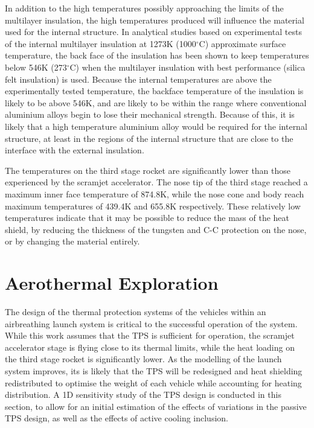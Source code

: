 In addition to the high temperatures possibly approaching the limits of the multilayer insulation, the high temperatures produced will influence the material used for the internal structure. 
In analytical studies based on experimental tests of the internal multilayer insulation at 1273K (1000$^\circ$C) approximate surface temperature, the back face of the insulation has been shown to keep temperatures below 546K (273$^\circ$C)\cite{Kourtides} when the multilayer insulation with best performance (silica felt insulation\cite{Kourtides}) is used. Because the internal temperatures are above the experimentally tested temperature, the backface temperature of the insulation is likely to be above 546K, and are likely to be within the range where conventional aluminium alloys begin to lose their mechanical strength. Because of this, it is likely that a high temperature aluminium alloy would be required for the internal structure, at least in the regions of the internal structure that are close to the interface with the external insulation.

The temperatures on the third stage rocket are significantly lower than those experienced by the scramjet accelerator. The nose tip of the third stage reached a maximum inner face temperature of 874.8K, while the nose cone and body reach maximum temperatures of 439.4K and 655.8K respectively. These relatively low temperatures indicate that it may be possible to reduce the mass of the heat shield, by reducing the thickness of the tungsten and C-C protection on the nose, or by changing the material entirely. 












\section{Aerothermal Exploration}

The design of the thermal protection systems of the vehicles within an airbreathing launch system is critical to the successful operation of the system. While this work assumes that the TPS is sufficient for operation, the scramjet accelerator stage is flying close to its thermal limits, while the heat loading on the third stage rocket is significantly lower. 
As the modelling of the launch system improves, its is likely that the TPS will be redesigned and heat shielding redistributed to optimise the weight of each vehicle while accounting for heating distribution. A 1D sensitivity study of the TPS design is conducted in this section, to allow for an initial estimation of the effects of variations in the passive TPS design, as well as the effects of active cooling inclusion. 

